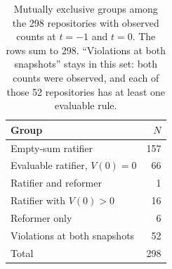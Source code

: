 \begin{table}[t]
\centering
\caption{Mutually exclusive groups among the 298 repositories
with observed counts at $t{=}{-}1$ and $t{=}0$.
The rows sum to 298.
``Violations at both snapshots'' stays in this set:
both counts were observed, and each of those 52 repositories
has at least one evaluable rule.}
\label{tab:rq4_labels}
\small
\setlength{\tabcolsep}{4pt}
\setlength{\aboverulesep}{0pt}
\setlength{\belowrulesep}{0pt}
\renewcommand{\arraystretch}{1.25}
\begin{tabular}{@{}lr@{}}
\toprule
\textbf{Group} & \textbf{$N$} \\
\midrule
\rowcolor{rowband}
Empty-sum ratifier & 157 \\
Evaluable ratifier, $V(0){=}0$ & 66 \\
\rowcolor{rowband}
Ratifier and reformer & 1 \\
Ratifier with $V(0){>}0$ & 16 \\
\rowcolor{rowband}
Reformer only & 6 \\
Violations at both snapshots & 52 \\
\midrule
Total & 298 \\
\bottomrule
\end{tabular}
\end{table}
